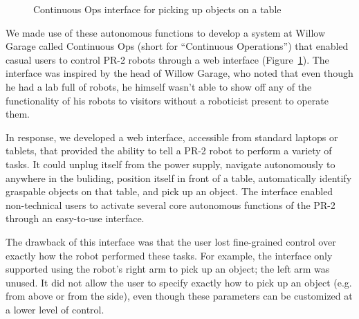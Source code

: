 \documentclass[10pt,twocolumn]{article}
\begin{document}
\begin{figure}[tbh]
\center{}
\caption{Continuous Ops interface for picking up objects on a table}
\label{contops}
\end{figure}

We made use of these autonomous functions to develop a system at Willow Garage called Continuous Ops (short for ``Continuous Operations'') that enabled casual users to control PR-2 robots through a web interface (Figure~\ref{contops}).
The interface was inspired by the head of Willow Garage, who noted that even though he had a lab full of robots, he himself wasn't able to show off any of the functionality of his robots to visitors without a roboticist present to operate them.

In response, we developed a web interface, accessible from standard laptops or tablets, that provided the ability to tell a PR-2 robot to perform a variety of tasks.  It could unplug itself from the power supply, navigate autonomously to anywhere in the buliding, position itself in front of a table, automatically identify graspable objects on that table, and pick up an object.
The interface enabled non-technical users to activate several core autonomous functions of the PR-2 through an easy-to-use interface.

The drawback of this interface was that the user lost fine-grained control over exactly how the robot performed these tasks. For example, the interface only supported using the robot's right arm to pick up an object; the left arm was unused. It did not allow the user to specify exactly how to pick up an object (e.g. from above or from the side), even though these parameters can be customized at a lower level of control. 
\end{document}
